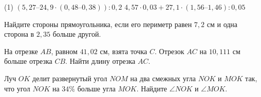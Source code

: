 \begin{homework}[number=1]
	\begin{listofex}
		\item \begin{tasks}(1)
			\task \( (5,27 – 24,9 \cdot (0,48 – 0,38)) : 0,2 \)
			\task \( 4,57\cdot 0,03 + 27,1 \cdot (1,56 – 1,46) : 0,05 \)
		\end{tasks}
		\item Найдите стороны прямоугольника, если его периметр равен \( 7,2 \) см и одна сторона в \( 2,35 \) больше другой.
		\item На отрезке \( AB \), равном \( 41,02  \) см, взята точка \( C \).
		Отрезок \( AC \) на \( 10,111 \) см больше отрезка \( CB \). Найти длину отрезка \( AC \).
		\item Луч \( OK \) делит развернутый угол \( NOM \) на два смежных угла \( NOK \) и \( MOK \) так, что угол \( NOK \) на \( 34\% \) больше угла \( MOK \). Найдите \( \angle NOK \) и \( \angle MOK \).
	\end{listofex}
\end{homework}

